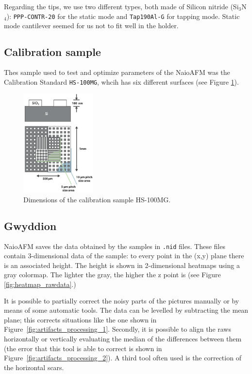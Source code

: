 \documentclass[11pt,a4paper]{article}
\begin{document}
Regarding the tips, we use two different types, both made of Silicon nitride (Si$_3$N$_4$): \texttt{PPP-CONTR-20} for the static mode and \texttt{Tap190Al-G} for tapping mode. Static mode cantilever seemed for us not to fit well in the holder.

\subsection{Calibration sample}

Thes sample used to test and optimize parameters of the NaioAFM was the Calibration Standard \texttt{HS-100MG}, whcih has six different surfaces (see Figure \ref{fig:HS-100MG}).

\begin{figure}[H]
\centering
\includegraphics[width=0.34\textwidth]{HS-100MG}
\caption{Dimensions of the calibration sample HS-100MG.}
\label{fig:HS-100MG}
\end{figure}

\subsection{Gwyddion}

NaioAFM saves the data obtained by the samples in \texttt{.nid} files. These files contain 3-dimensional data of the sample: to every point in the (x,y) plane there is an associated height. The height is shown in 2-dimensional heatmaps using a gray colormap. The lighter the gray, the higher the z point is (see Figure \ref{fig:heatmap_rawdata}.)

It is possible to partially correct the noisy parts of the pictures manually or by means of some automatic tools. The data can be levelled by subtracting the mean plane; this corrects situations like the one shown in Figure~\ref{fig:artifacts_processing_1}. Secondly, it is possible to align the raws horizontally or vertically evaluating the median of the differences between them (the error that this tool is able to correct is shown in Figure~\ref{fig:artifacts_processing_2}). A third tool often used is the correction of the horizontal scars.
\end{document}
